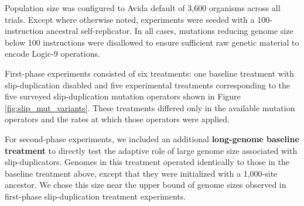 Population size was configured to Avida default of 3,600 organisms across all trials.
Except where otherwise noted, experiments were seeded with a 100-instruction ancestral self-replicator.
In all cases, mutations reducing genome size below 100 instructions were disallowed to ensure sufficient raw genetic material to encode Logic-9 operations.

% 

First-phase experiments consisted of six treatments: one baseline treatment with slip-duplication disabled and five experimental treatments corresponding to the five surveyed slip-duplication mutation operators shown in Figure \ref{fig:slip_mut_variants}.
These treatments differed only in the available mutation operators and the rates at which those operators were applied.


For second-phase experiments, we included an additional \textbf{long-genome baseline treatment} to directly test the adaptive role of large genome size associated with slip-duplicators.
Genomes in this treatment operated identically to those in the baseline treatment above, except that they were initialized with a 1,000-site ancestor.
We chose this size near the upper bound of genome sizes observed in first-phase slip-duplication treatment experiments.



